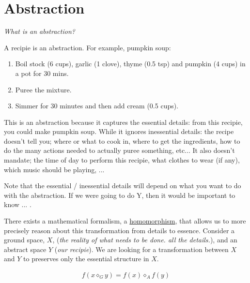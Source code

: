 \chapter{Abstraction}\label{C:abstraction}


\begin{displayquote}
 \textit{What is an abstraction?}
\end{displayquote}

A recipie is an abstraction. For example, pumpkin soup:

\begin{enumerate}
\tightlist
\item Boil stock (6 cups), garlic (1 clove), thyme (0.5 tsp) and pumpkin (4 cups) in a pot for 30 mins.
\item Puree the mixture.
\item Simmer for 30 minutes and then add cream (0.5 cups).
\end{enumerate}

This is an abstraction because it captures the essential details: from this recipie, you could make pumpkin soup.
While it ignores inessential details: the recipe doesn't tell you; where or what to cook in, where to get the
ingredients, how to do the many actions needed to actually puree something, etc...
It also doesn't mandate; the time of day to perform this recipie, what clothes to wear (if any),
which music should be playing, ...

Note that the essential / inessential details will depend on what you want to do with the abstraction.
If we were going to do Y, then it would be important to know ... .

\vspace{5mm}

There exists a mathematical formalism, a  \href{https://en.wikipedia.org/wiki/Homomorphism}{homomorphism},
that allows us to more precisely reason about this transformation from
details to essence. Consider a ground space, $X$, (\textit{the reality of what
needs to be done. all the details.}), and an abstract space $Y$ (\textit{our recipie}).
We are looking for a transformation between $X$ and $Y$ to preserves only the essential
structure in $X$.


\begin{align*}
f(x \diamond_G y) = f(x) \diamond_A f(y)
\end{align*}

